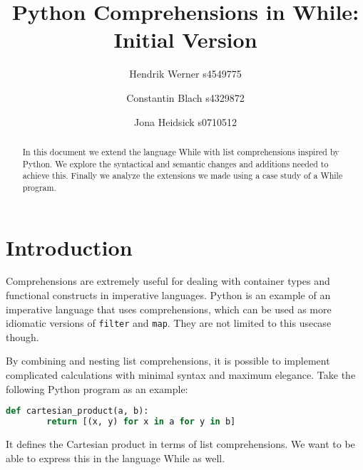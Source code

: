 \documentclass[12pt]{article}
\title{
    Python Comprehensions in While:\\
    Initial Version
}
\author{
    Hendrik Werner s4549775
    \and Constantin Blach s4329872
    \and Jona Heidsick s0710512
}
\newcommand\mono\texttt
\begin{document}
\maketitle

\begin{abstract}
\noindent %
In this document we extend the language While with list comprehensions inspired by Python. We explore the syntactical and semantic changes and additions needed to achieve this. Finally we analyze the extensions we made using a case study of a While program.
\end{abstract}

\section{Introduction}
Comprehensions are extremely useful for dealing with container types and functional constructs in imperative languages. Python is an example of an imperative language that uses comprehensions, which can be used as more idiomatic versions of \mono{filter} and \mono{map}. They are not limited to this usecase though.

By combining and nesting list comprehensions, it is possible to implement complicated calculations with minimal syntax and maximum elegance. Take the following Python program as an example:

\begin{lstlisting}[language=Python]
    def cartesian_product(a, b):
        return [(x, y) for x in a for y in b]
\end{lstlisting}

It defines the Cartesian product in terms of list comprehensions. We want to be able to express this in the language While as well.
\end{document}
